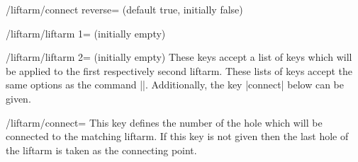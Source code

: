 \documentclass[a4paper,english,dvipsnames]{ltxdoc}
\begin{document}
\begin{command}{\liftarmconnect{}}
\begin{key}{/liftarm/connect reverse= (default true, initially false)}
\begin{codeexample}[width=10cm]
\end{codeexample}
\end{key}
\begin{stylekey}{/liftarm/liftarm 1= (initially \normalfont empty)}
\end{stylekey}
\begin{stylekey}{/liftarm/liftarm 2= (initially \normalfont empty)}
These keys accept a list of keys which will be applied to the first respectively second liftarm. These lists of keys accept the same options as the command |\liftarm|. Additionally, the key |connect| below can be given.
\begin{key}{/liftarm/connect=}
This key defines the number of the hole which will be connected to the matching liftarm. If this key is not given then the last hole of the liftarm is taken as the connecting point.
\begin{codeexample}[width=10cm]
\end{codeexample}
\end{key}
\end{stylekey}
\end{command}
\end{document}
